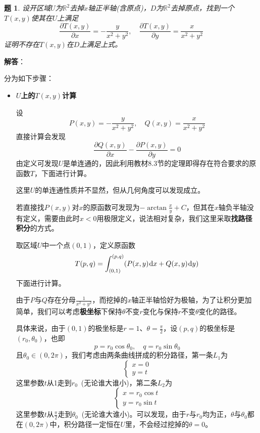 \documentclass[a4paper,UTF8,fontset=windows,AutoFakeBold]{ctexart}
\newcommand*{\dr}{\hspace{0.07em}\mathrm{d}}
\newcommand*{\rb}{\mathbb{R}}
\newcommand*{\note}{\noindent *}
\theoremstyle{ex}
\newtheorem{exercise}{题}
\newcommand{\sol}[1]{{\vspace{5pt}\kaishu\noindent\textbf{解答}：\vspace{-3pt}
\begin{compactitem}
    \item[] #1
\end{compactitem}
}}
\begin{document}
\begin{framed}
\begin{exercise}\label{unique}
    设开区域$U$为$\rb^2$去掉$x$轴正半轴(含原点)，$D$为$\rb^2$去掉原点，找到一个$T(x,y)$使其在$U$上满足
    $$\frac{\partial T(x,y)}{\partial x}=-\frac{y}{x^2+y^2},\quad\frac{\partial T(x,y)}{\partial y}=\frac{x}{x^2+y^2}$$
    证明不存在$T(x,y)$在$D$上满足上式。
\end{exercise}
\sol{
    分为如下步骤：
    \begin{itemize}
        \item \textbf{$U$上的$T(x,y)$计算}
        
        设
        $$P(x,y)=-\frac{y}{x^2+y^2},\quad Q(x,y)=\frac{x}{x^2+y^2}$$
        直接计算会发现
        $$\frac{\partial Q(x,y)}{\partial x}-\frac{\partial P(x,y)}{\partial y}=0$$
        由定义可发现$U$是单连通的，因此利用教材8.3节的定理即得存在符合要求的原函数$T$，下面进行计算。

        \note 这里$U$的单连通性质并不显然，但从几何角度可以发现成立。

        \note 若直接找$P(x,y)$对$x$的原函数可发现为$-\arctan\frac{x}{y}+C$，但其在$x$轴负半轴没有定义，需要由此时$x<0$用极限定义，说法相对复杂，我们这里采取\textbf{找路径积分}的方式。

        取区域$U$中一个点$(0,1)$，定义原函数
        $$T(p,q)=\int_{(0,1)}^{(p,q)}(P(x,y)\dr x+Q(x,y)\dr y)$$
        下面进行计算。

        由于$P$与$Q$存在分母$\frac{1}{x^2+y^2}$，而挖掉的$x$轴正半轴恰好为极轴，为了让积分更加简单，我们可以考虑\textbf{极坐标}下保持$\theta$不变$r$变化与保持$r$不变$\theta$变化的路径。

        具体来说，由于$(0,1)$的极坐标是$r=1$、$\theta=\frac{\pi}{2}$，设$(p,q)$的极坐标是$(r_0,\theta_0)$，也即
        $$p=r_0\cos\theta_0,\quad q=r_0\sin\theta_0$$
        且$\theta_0\in(0,2\pi)$，我们考虑由两条曲线拼成的积分路径，第一条$L_1$为
        $$\begin{cases}x=0\\y=t\end{cases}$$
        这里参数$t$从1走到$r_0$\ (无论谁大谁小)，第二条$L_2$为
        $$\begin{cases}x=r_0\cos t\\y=r_0\sin t\end{cases}$$
        这里参数$t$从$\frac{\pi}{2}$走到$\theta_0$\ (无论谁大谁小)。可以发现，由于$r$与$r_0$均为正，$\theta$与$\theta_0$都在$(0,2\pi)$中，积分路径一定恒在$U$里，不会经过挖掉的$\theta=0$。


\end{itemize}}
\end{framed}
\end{document}
